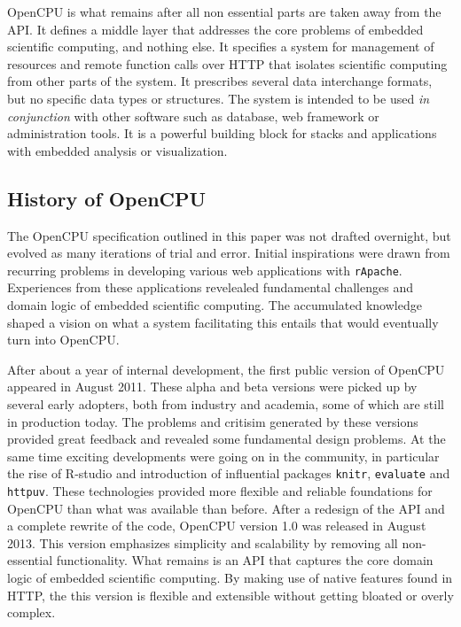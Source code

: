 OpenCPU is what remains after all non essential parts are taken away from the API. It defines a middle layer that addresses the core problems of embedded scientific computing, and nothing else. It specifies a system for management of resources and remote function calls over HTTP that isolates scientific computing from other parts of the system. It prescribes several data interchange formats, but no specific data types or structures. The system is intended to be used \emph{in conjunction} with other software such as database, web framework or administration tools. It is a powerful building block for stacks and applications with embedded analysis or visualization. 

\subsection{History of OpenCPU}

The OpenCPU specification outlined in this paper was not drafted overnight, but evolved as many iterations of trial and error. Initial inspirations were drawn from recurring problems in developing various \R web applications with \texttt{rApache}. Experiences from these applications revelealed fundamental challenges and domain logic of embedded scientific computing. The accumulated knowledge shaped a vision on what a system facilitating this entails that would eventually turn into OpenCPU.

After about a year of internal development, the first public version of OpenCPU appeared in August 2011. These alpha and beta versions were picked up by several early adopters, both from industry and academia, some of which are still in production today. The problems and critisim generated by these versions provided great feedback and revealed some fundamental design problems. At the same time exciting developments were going on in the \R community, in particular the rise of R-studio and introduction of influential \R packages \texttt{knitr}, \texttt{evaluate} and \texttt{httpuv}. These technologies provided more flexible and reliable foundations for OpenCPU than what was available than before. After a redesign of the API and a complete rewrite of the code, OpenCPU version  1.0 was released in August 2013. This version emphasizes simplicity and scalability by removing all non-essential functionality. What remains is an API that captures the core domain logic of embedded scientific computing. By making use of native features found in HTTP, the this version is flexible and extensible without getting bloated or overly complex.

